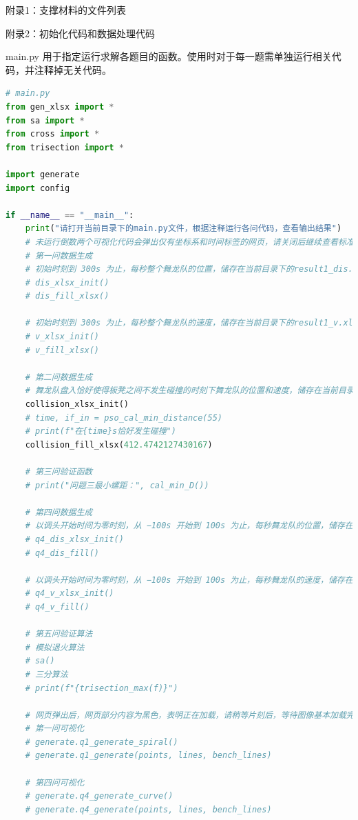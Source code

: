 \documentclass[a4paper]{article}
\begin{document}
	附录1：支撑材料的文件列表
	
	
	
	附录2：初始化代码和数据处理代码
	
	main.py 用于指定运行求解各题目的函数。使用时对于每一题需单独运行相关代码，并注释掉无关代码。
	\begin{lstlisting}[language=python,columns=fullflexible,frame=shadowbox]
# main.py
from gen_xlsx import *
from sa import *
from cross import *
from trisection import *

import generate
import config

if __name__ == "__main__":
	print("请打开当前目录下的main.py文件，根据注释运行各问代码，查看输出结果")
	# 未运行倒数两个可视化代码会弹出仅有坐标系和时间标签的网页，请关闭后继续查看标准输出框的结果
	# 第一问数据生成
	# 初始时刻到 300s 为止，每秒整个舞龙队的位置，储存在当前目录下的result1_dis.xlsx中
	# dis_xlsx_init()
	# dis_fill_xlsx()
	
	# 初始时刻到 300s 为止，每秒整个舞龙队的速度，储存在当前目录下的result1_v.xlsx中
	# v_xlsx_init()
	# v_fill_xlsx()
	
	# 第二问数据生成
	# 舞龙队盘入恰好使得板凳之间不发生碰撞的时刻下舞龙队的位置和速度，储存在当前目录下的result2.xlsx中
	collision_xlsx_init()
	# time, if_in = pso_cal_min_distance(55)
	# print(f"在{time}s恰好发生碰撞")
	collision_fill_xlsx(412.4742127430167)
	
	# 第三问验证函数
	# print("问题三最小螺距：", cal_min_D())
	
	# 第四问数据生成
	# 以调头开始时间为零时刻，从 −100s 开始到 100s 为止，每秒舞龙队的位置，储存在当前目录下的result4_dis.xlsx中
	# q4_dis_xlsx_init()
	# q4_dis_fill()
	
	# 以调头开始时间为零时刻，从 −100s 开始到 100s 为止，每秒舞龙队的速度，储存在当前目录下的result4_v.xlsx中
	# q4_v_xlsx_init()
	# q4_v_fill()
	
	# 第五问验证算法
	# 模拟退火算法
	# sa()
	# 三分算法
	# print(f"{trisection_max(f)}")
	
	# 网页弹出后，网页部分内容为黑色，表明正在加载，请稍等片刻后，等待图像基本加载完毕，使用鼠标拖动边框或在可视化界面中滑动滚轮调节图像大小
	# 第一问可视化
	# generate.q1_generate_spiral()
	# generate.q1_generate(points, lines, bench_lines)
	
	# 第四问可视化
	# generate.q4_generate_curve()
	# generate.q4_generate(points, lines, bench_lines)
 	\end{lstlisting}
 	
\end{document}
